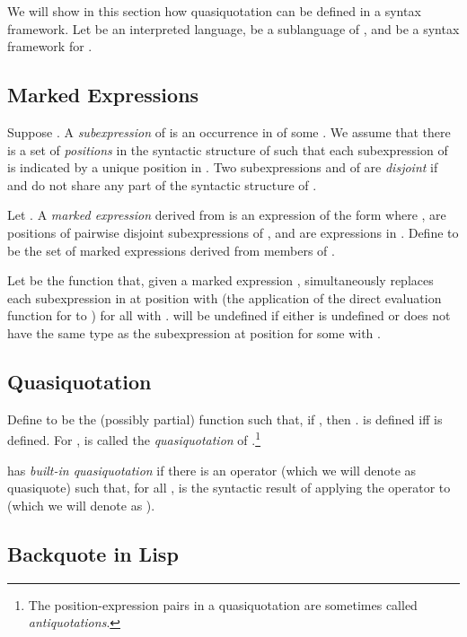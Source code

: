 \documentclass[11pt,fleqn]{article}
\newcommand{\bsp}{\begin{sloppypar}}
\newcommand{\esp}{\end{sloppypar}}
\newcommand{\mname}[1]{\mbox{\sf #1}}
\begin{document}
\bsp We will show in this section how quasiquotation can be defined in
a syntax framework.  Let  be an interpreted language,  be a sublanguage of , and  be a syntax framework for . \esp

\subsection{Marked Expressions} \label{subsec:marked-expr}

Suppose .  A \emph{subexpression} of  is an occurrence in
 of some .  We assume that there is a set of
\emph{positions} in the syntactic structure of  such that each
subexpression of  is indicated by a unique position in .  Two
subexpressions  and  of  are \emph{disjoint} if  and
 do not share any part of the syntactic structure of .

Let .  A \emph{marked expression} derived from 
is an expression of the form 
where ,  are positions of pairwise disjoint
subexpressions of , and  are expressions in .
Define  to be the set of marked expressions
derived from members of .

\bsp Let  be the function
that, given a marked expression ,
simultaneously replaces each subexpression in  at position 
with  (the application of the direct evaluation
function for  to ) for all  with .  
will be undefined if either  is undefined or
 does not have the same type as the subexpression at
position  for some  with .  \esp

\subsection{Quasiquotation}

Define  to be
the (possibly partial) function such that, if , then
.   is defined iff 
is defined.  For ,  is
called the \emph{quasiquotation} of .\footnote{The
  position-expression pairs  in a quasiquotation
   are sometimes
  called \emph{antiquotations}.}

 has \emph{built-in quasiquotation} if there is an operator (which
we will denote as \mname{quasiquote}) such that, for all , 
is the syntactic result of applying the operator to
 (which we will denote as
).

\subsection{Backquote in Lisp} \label{subsec:backquote} 
\end{document}
